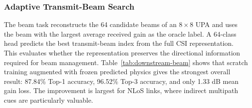 \begin{table}[H]
\centering
\caption{MCS link adaptation under calibrated BLER constraints. Lower is better for MCS MAE and
BLER violation; higher is better for accuracy, goodput ratio, and outage recall. The final row
compares the highlighted model with the best of the three language-model baselines (red:
improvement; blue: degradation).}
\label{tab:downstream-mcs}
\scriptsize
\setlength{\tabcolsep}{2.0pt}
\end{table}

\subsubsection{Adaptive Transmit-Beam Search}

The beam task reconstructs the 64 candidate beams of an $8\times8$ UPA and uses the beam with the
largest average received gain as the oracle label. A 64-class head predicts the best transmit-beam
index from the full CSI representation. This evaluates whether the representation preserves the
directional information required for beam management. Table~\ref{tab:downstream-beam} shows that
scratch training augmented with frozen predicted physics gives the strongest overall result: 87.84\%
Top-1 accuracy, 96.52\% Top-3 accuracy, and only 1.33 dB mean gain loss. The improvement is largest
for NLoS links, where indirect multipath cues are particularly valuable.

